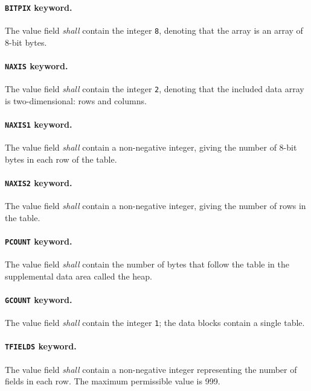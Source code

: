 \documentclass[onecolumn]{aa}
\begin{document}
   \paragraph{{\tt BITPIX} keyword.}
 The value field {\em shall} contain the integer {\tt 8}, denoting
 that the array is an array of 8-bit bytes. 
  
   \paragraph{{\tt NAXIS} keyword.}
 The value field {\em shall} contain the integer {\tt 2}, denoting
 that the included data array is two-dimensional: rows and
 columns.
  
   \paragraph{{\tt NAXIS1} keyword.}
 The value field {\em shall} contain a non-negative integer, 
 giving
 the number of 8-bit bytes in each row of the table.
  
   \paragraph{{\tt NAXIS2} keyword.}
 The value field {\em shall} contain a non-negative integer, 
 giving
 the number of rows in the table.
  
   \paragraph{{\tt PCOUNT} keyword.}
 The value field {\em shall} contain the number of bytes 
 that follow the table in the supplemental data area called the heap. 
 

   \paragraph{{\tt GCOUNT} keyword.}
 The value field {\em shall} contain the integer {\tt 1}; the
 data blocks contain a single table.
  
   \paragraph{{\tt TFIELDS} keyword.}
 The value field {\em shall} contain a non-negative integer 
 representing
 the number of fields in each row.  The maximum
 permissible value is 999.
  
\end{document}
